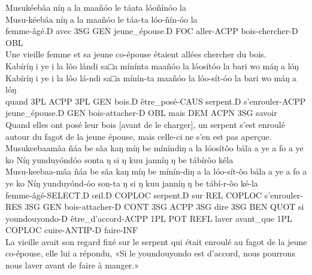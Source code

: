 \documentclass[a4paper,11pt]{article}
\begin{document}
\ea
\glll
Musukéebâa níŋ a la maañóo le táata lóoñínóo la\\
Musu-kéebâa níŋ a la maañóo le táa-ta lóo-ñín-óo la\\
femme-âgé.D avec 3SG GEN jeune\_épouse.D FOC aller-ACPP bois-chercher-D OBL\\
\glt{} Une vieille femme et sa jeune co-épouse étaient allées chercher du bois.\\
\z
\ea
\glll
Kabíríŋ i ye i la lôo lándi sa□a mínínta maañóo la lóosítóo la bari wo máŋ a lóŋ\\
Kabíríŋ i ye i la lôo lá-ndi sa□a mínín-ta maañóo la lóo-sít-óo la bari wo máŋ a lóŋ\\
quand 3PL ACPP 3PL GEN bois.D être\_posé-CAUS serpent.D s’enrouler-ACPP jeune\_épouse.D GEN bois-attacher-D OBL mais DEM ACPN 3SG savoir\\
\glt{} Quand elles ont posé leur bois [avant de le charger], un serpent s’est enroulé autour du fagot de la jeune épouse, mais celle-ci ne s’en est pas aperçue.\\
\z
\ea
\glll
Musukeebaamâa ñáa be sǎa kaŋ míŋ be míníndiŋ a la lóosítôo bála a ye a fo a ye ko Níŋ yunduyóndóo sonta ŋ si ŋ kuu janníŋ ŋ be tábírôo kéla\\
Musu-keebaa-mâa ñáa be sǎa kaŋ míŋ be mínín-diŋ a la lóo-sít-ôo bála a ye a fo a ye ko Níŋ yunduyónd-óo son-ta ŋ si ŋ kuu janníŋ ŋ be tábí-r-ôo ké-la\\
femme-âgé-SELECT.D œil.D COPLOC serpent.D sur REL COPLOC s’enrouler-RES 3SG GEN bois-attacher-D CONT 3SG ACPP 3SG dire 3SG BEN QUOT si youndouyondo-D être\_d’accord-ACPP 1PL POT REFL laver avant\_que 1PL COPLOC cuire-ANTIP-D faire-INF\\
\glt{} La vieille avait son regard fixé sur le serpent qui était enroulé au fagot de la jeune co-épouse, elle lui a répondu, «Si le youndouyondo est d’accord, nous pourrons nous laver avant de faire à manger.»\\
\z
\end{document}
